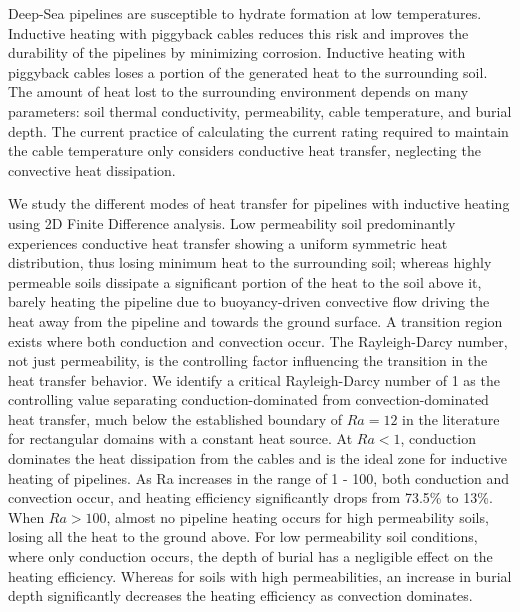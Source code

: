 \documentclass[Journal,letterpaper,InsideFigs]{ascelike-new}
\begin{document}
Deep-Sea pipelines are susceptible to hydrate formation at low temperatures. Inductive heating with piggyback cables reduces this risk and improves the durability of the pipelines by minimizing corrosion. Inductive heating with piggyback cables loses a portion of the generated heat to the surrounding soil. The amount of heat lost to the surrounding environment depends on many parameters: soil thermal conductivity, permeability, cable temperature, and burial depth. The current practice of calculating the current rating required to maintain the cable temperature only considers conductive heat transfer, neglecting the convective heat dissipation. 

We study the different modes of heat transfer for pipelines with inductive heating using 2D Finite Difference analysis. Low permeability soil predominantly experiences conductive heat transfer showing a uniform symmetric heat distribution, thus losing minimum heat to the surrounding soil;  whereas highly permeable soils dissipate a significant portion of the heat to the soil above it, barely heating the pipeline due to buoyancy-driven convective flow driving the heat away from the pipeline and towards the ground surface. A transition region exists where both conduction and convection occur. The Rayleigh-Darcy number, not just permeability, is the controlling factor influencing the transition in the heat transfer behavior. We identify a critical Rayleigh-Darcy number of 1 as the controlling value separating conduction-dominated from convection-dominated heat transfer, much below the established boundary of $Ra = 12$ in the literature for rectangular domains with a constant heat source. At $Ra < 1$, conduction dominates the heat dissipation from the cables and is the ideal zone for inductive heating of pipelines. As Ra increases in the range of 1 - 100, both conduction and convection occur, and heating efficiency significantly drops from 73.5\% to 13\%. When $Ra > 100$, almost no pipeline heating occurs for high permeability soils, losing all the heat to the ground above. For low permeability soil conditions, where only conduction occurs, the depth of burial has a negligible effect on the heating efficiency. Whereas for soils with high permeabilities, an increase in burial depth significantly decreases the heating efficiency as convection dominates.
\pagebreak
%
\appendix
%
\end{document}
